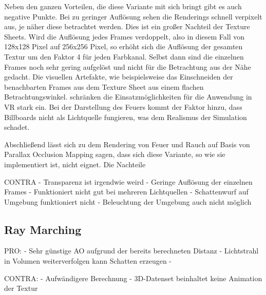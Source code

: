Neben den ganzen Vorteilen, die diese Variante mit sich bringt gibt es auch negative Punkte. Bei zu geringer Auflösung sehen die Renderings schnell
verpixelt aus, je näher diese betrachtet werden. Dies ist ein großer Nachteil der Texture Sheets. Wird die Auflösung jedes Frames verdoppelt, also in diesem 
Fall von 128x128 Pixel auf 256x256 Pixel, so erhöht sich die Auflösung der gesamten Textur um den Faktor 4 für jeden Farbkanal. Selbst dann sind
die einzelnen Frames noch sehr gering aufgelöst und nicht für die Betrachtung aus der Nähe gedacht. 
Die visuellen Artefakte, wie beispielsweise das Einschneiden der benachbarten Frames aus dem Texture Sheet aus einem flachen Betrachtungswinkel. 
schränken die Einsatzmöglichkeiten für die Anwendung in VR stark ein. 
Bei der Darstellung des Feuers kommt der Faktor hinzu, dass Billboards nicht als Lichtquelle fungieren, was dem Realismus der Simulation schadet. 

Abschließend lässt sich zu dem Rendering von Feuer und Rauch auf Basis von Parallax Occlusion Mapping sagen, dass sich diese Variante, so wie sie implementiert
ist, nicht eignet. Die Nachteile 



CONTRA\newline
- Transparenz ist irgendwie weird\newline
- Geringe Auflösung der einzelnen Frames \newline
- Funktioniert nicht gut bei mehreren Lichtquellen\newline
- Schattenwurf auf Umgebung funktioniert nicht\newline
- Beleuchtung der  Umgebung auch nicht möglich\newline




\subsection{Ray Marching}
\label{sec:5.2}

PRO: \newline
- Sehr günstige AO aufgrund der bereits berechneten Distanz\newline
- Lichtstrahl in Volumen weiterverfolgen kann Schatten erzeugen\newline
- 

CONTRA: \newline
- Aufwändigere Berechnung\newline
- 3D-Datenset beinhaltet keine Animation der Textur\newline




